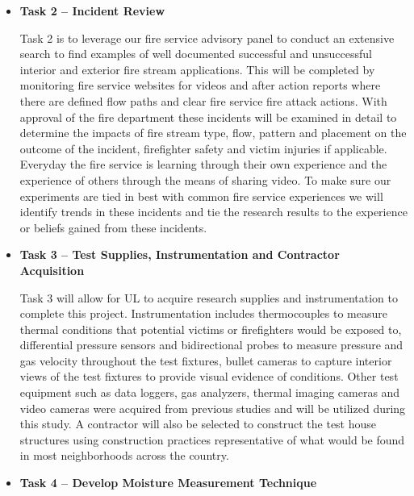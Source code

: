 \documentclass{article}
\begin{document}
\begin{itemize}
\item \bf{Task 2 – Incident Review}
\normalfont
\vspace*{\baselineskip}

Task 2 is to leverage our fire service advisory panel to conduct an extensive search to find examples of well documented successful and unsuccessful interior and exterior fire stream applications. This will be completed by monitoring fire service websites for videos and after action reports where there are defined flow paths and clear fire service fire attack actions. With approval of the fire department these incidents will be examined in detail to determine the impacts of fire stream type, flow, pattern and placement on the outcome of the incident, firefighter safety and victim injuries if applicable. Everyday the fire service is learning through their own experience and the experience of others through the means of sharing video. To make sure our experiments are tied in best with common fire service experiences we will identify trends in these incidents and tie the research results to the experience or beliefs gained from these incidents.
\vspace*{\baselineskip}

\item \bf{Task 3 – Test Supplies, Instrumentation and Contractor Acquisition}
\normalfont
\vspace*{\baselineskip}

Task 3 will allow for UL to acquire research supplies and instrumentation to complete this project. Instrumentation includes thermocouples to measure thermal conditions that potential victims or firefighters would be exposed to, differential pressure sensors and bidirectional probes to measure pressure and gas velocity throughout the test fixtures, bullet cameras to capture interior views of the test fixtures to provide visual evidence of conditions. Other test equipment such as data loggers, gas analyzers, thermal imaging cameras and video cameras were acquired from previous studies and will be utilized during this study. A contractor will also be selected to construct the test house structures using construction practices representative of what would be found in most neighborhoods across the country.
\vspace*{\baselineskip}

\item \bf{Task 4 – Develop Moisture Measurement Technique}
\normalfont
\vspace*{\baselineskip}


\end{itemize}
\end{document}
